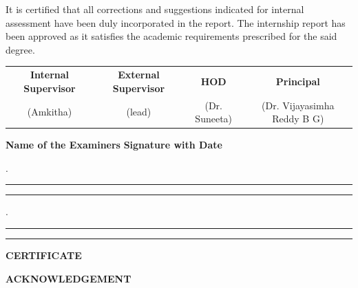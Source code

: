\documentclass[12pt,a4paper]{report}
\begin{document}
\vspace{0.25cm}

\noindent
It is certified that all corrections and suggestions indicated for internal assessment have been duly incorporated in the report. The internship report has been approved as it satisfies the academic requirements prescribed for the said degree.

\vspace{1.2cm}

\begin{center}

\renewcommand{\arraystretch}{1.15}

\begin{tabular}{c c c c}

\textbf{Internal Supervisor} &
\textbf{External Supervisor} &
\textbf{HOD} &
\textbf{Principal}
\\[4pt]

(Amkitha) &
(lead) &
(Dr. Suneeta) &
(Dr. Vijayasimha Reddy B G)

\end{tabular}

\end{center}

\vspace{1cm}

\noindent
\textbf{Name of the Examiners}
\hfill
\textbf{Signature with Date}

\vspace{0.4cm}

.\hspace{0.2cm}\rule{5cm}{0.4pt}
\hfill
\rule{4cm}{0.4pt}

\vspace{0.4cm}

.\hspace{0.2cm}\rule{5cm}{0.4pt}
\hfill
\rule{4cm}{0.4pt}


\newpage
\setcounter{page}{2}  %
\begin{center}
{\LARGE \textbf{CERTIFICATE}\par}
\end{center}

\vspace{0.5cm}
\setlength{\parskip}{1em}


\newpage
\setcounter{page}{3}  %
\begin{center}
{\LARGE \textbf{ACKNOWLEDGEMENT}\par}
\end{center}
\end{document}
